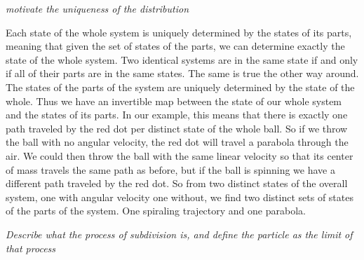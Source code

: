 \documentclass{article}
\begin{document}
	\emph{motivate the uniqueness of the distribution}	
	
	Each state of the whole system is uniquely determined by the states of its parts, meaning that given the set of states of the parts, we can determine exactly the state of the whole system. Two identical systems are in the same state if and only if all of their parts are in the same states. The same is true the other way around. The states of the parts of the system are uniquely determined by the state of the whole. Thus we have an invertible map between the state of our whole system and the states of its parts. In our example, this means that there is exactly one path traveled by the red dot per distinct state of the whole ball. So if we throw the ball with no angular velocity, the red dot will travel a parabola through the air. We could then throw the ball with the same linear velocity so that its center of mass travels the same path as before, but if the ball is spinning we have a different path traveled by the red dot. So from two distinct states of the overall system, one with angular velocity one without, we find two distinct sets of states of the parts of the system. One spiraling trajectory and one parabola.
		
	 
	 \emph{Describe what the process of subdivision is, and define the particle as the limit of that process}
	 
\end{document}
